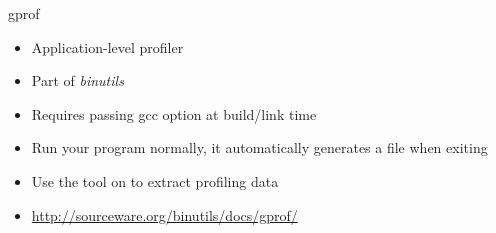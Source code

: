 \begin{frame}{gprof}
  \begin{itemize}
  \item Application-level profiler
  \item Part of {\em binutils}
  \item Requires passing gcc  option at build/link time
  \item Run your program normally, it automatically generates a
     file when exiting
  \item Use the  tool on  to extract
    profiling data
  \item \url{http://sourceware.org/binutils/docs/gprof/}
  \end{itemize}
\end{frame}

